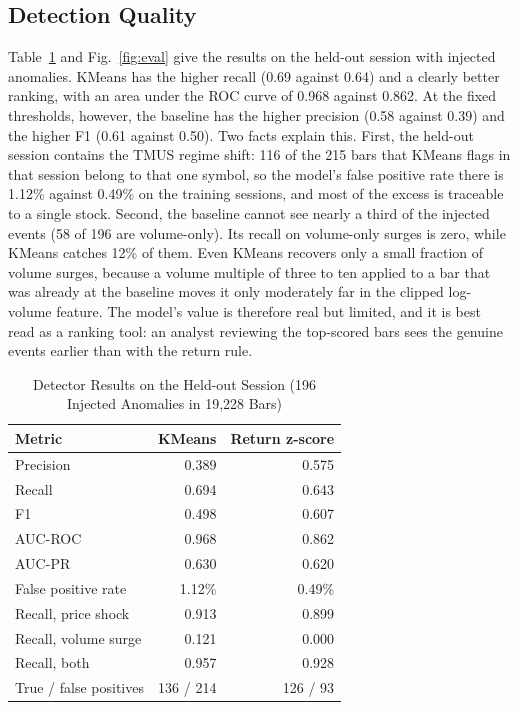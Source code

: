 \documentclass[conference]{IEEEtran}
\begin{document}
\subsection{Detection Quality}
Table~\ref{tab:eval} and Fig.~\ref{fig:eval} give the results on the held-out session with injected anomalies. KMeans has the higher recall (0.69 against 0.64) and a clearly better ranking, with an area under the ROC curve of 0.968 against 0.862. At the fixed thresholds, however, the baseline has the higher precision (0.58 against 0.39) and the higher F1 (0.61 against 0.50). Two facts explain this. First, the held-out session contains the TMUS regime shift: 116 of the 215 bars that KMeans flags in that session belong to that one symbol, so the model's false positive rate there is 1.12\% against 0.49\% on the training sessions, and most of the excess is traceable to a single stock. Second, the baseline cannot see nearly a third of the injected events (58 of 196 are volume-only). Its recall on volume-only surges is zero, while KMeans catches 12\% of them. Even KMeans recovers only a small fraction of volume surges, because a volume multiple of three to ten applied to a bar that was already at the baseline moves it only moderately far in the clipped log-volume feature. The model's value is therefore real but limited, and it is best read as a ranking tool: an analyst reviewing the top-scored bars sees the genuine events earlier than with the return rule.

\begin{table}[t]
\caption{Detector Results on the Held-out Session (196 Injected Anomalies in 19,228 Bars)}
\label{tab:eval}
\centering
\small
\begin{tabular}{@{}lrr@{}}
\toprule
Metric & KMeans & Return z-score \\
\midrule
Precision & 0.389 & 0.575 \\
Recall & 0.694 & 0.643 \\
F1 & 0.498 & 0.607 \\
AUC-ROC & 0.968 & 0.862 \\
AUC-PR & 0.630 & 0.620 \\
False positive rate & 1.12\% & 0.49\% \\
Recall, price shock & 0.913 & 0.899 \\
Recall, volume surge & 0.121 & 0.000 \\
Recall, both & 0.957 & 0.928 \\
True / false positives & 136 / 214 & 126 / 93 \\
\bottomrule
\end{tabular}
\end{table}
\end{document}
